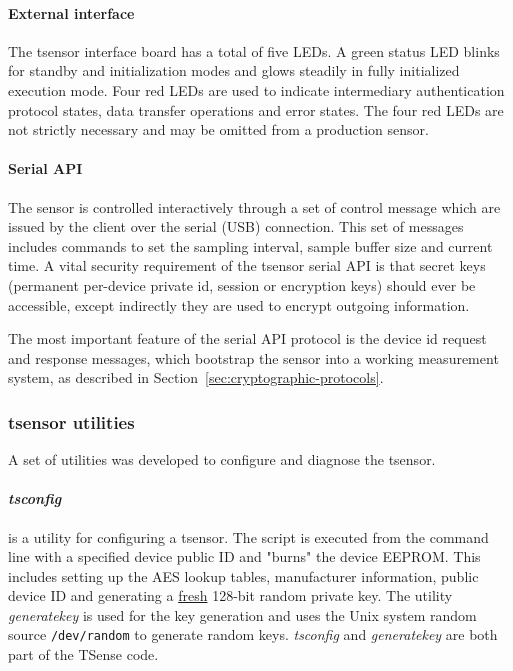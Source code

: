 \paragraph{External interface}

The tsensor interface board has a total of five LEDs. A green status LED blinks for standby and initialization modes and glows steadily in fully initialized execution mode. Four red LEDs are used to indicate intermediary authentication protocol states, data transfer operations and error states. The four red LEDs are not strictly necessary and may be omitted from a production sensor.

\paragraph{Serial API}

The sensor is controlled interactively through a set of control message which are issued by the client over the serial (USB) connection. This set of messages includes commands to set the sampling interval, sample buffer size and current time. 
A vital security requirement of the tsensor serial API is that secret keys (permanent per-device private id, session or encryption keys) should ever be accessible, except indirectly they are used to encrypt outgoing information.

The most important feature of the serial API protocol is the device id request and response messages, which bootstrap the sensor into a working measurement system, as described in Section~\ref{sec:cryptographic-protocols}.

\subsubsection{tsensor utilities}

A set of utilities was developed to configure and diagnose the tsensor.

\paragraph{\textit{tsconfig}} is a utility for configuring a tsensor. The script is executed from the command line with a specified device public ID and "burns" the device EEPROM. This includes setting up the AES lookup tables, manufacturer information, public device ID and generating a \underline{fresh} 128-bit random private key. The utility \textit{generatekey} is used for the key generation and uses the Unix system random source \texttt{/dev/random} to generate random keys. \textit{tsconfig} and \textit{generatekey} are both part of the TSense code.

